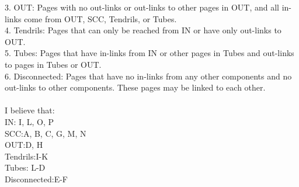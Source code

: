 \documentclass[10pt,letterpaper]{article}
\begin{document}
    3. OUT: Pages with no out-links or out-links to other pages in OUT, and all in-links come from OUT, SCC, Tendrils, or Tubes.\\ 
    4. Tendrils: Pages that can only be reached from IN or have only out-links to OUT. \\
    5. Tubes: Pages that have in-links from IN or other pages in Tubes and out-links to pages in Tubes or OUT.\\ 
    6. Disconnected: Pages that have no in-links from any other components and no out-links to other components. These pages may be linked to each other.\\
\cite{broder_2003}
\\
I believe that:\\
    IN: I, L, O, P\\ 
    SCC:A, B, C, G, M, N\\ 
    OUT:D, H \\ 
    Tendrils:I-K\\
    Tubes: L-D \\ 
    Disconnected:E-F\\ 

\pagebreak%



\end{document}
